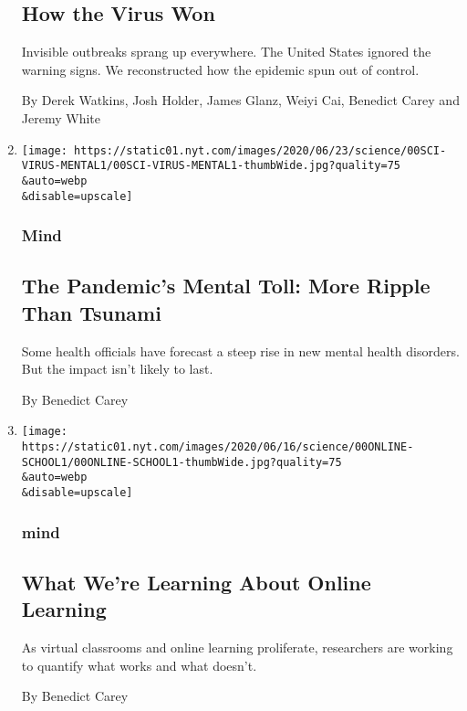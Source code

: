 \begin{enumerate}
  \hypertarget{how-the-virus-won}{%
  \subsection{How the Virus Won}\label{how-the-virus-won}}

  Invisible outbreaks sprang up everywhere. The United States ignored
  the warning signs. We reconstructed how the epidemic spun out of
  control.

  By Derek Watkins, Josh Holder, James Glanz, Weiyi Cai, Benedict Carey
  and Jeremy White
\item
  \href{/2020/06/21/health/coronavirus-mental-health-anxiety.html}{}

  \texttt{[image: https://static01.nyt.com/images/2020/06/23/science/00SCI-VIRUS-MENTAL1/00SCI-VIRUS-MENTAL1-thumbWide.jpg?quality=75\\\&auto=webp\\\&disable=upscale]}

  \hypertarget{mind}{%
  \subsubsection{Mind}\label{mind}}

  \hypertarget{the-pandemics-mental-toll-more-ripple-than-tsunami}{%
  \subsection{The Pandemic's Mental Toll: More Ripple Than
  Tsunami}\label{the-pandemics-mental-toll-more-ripple-than-tsunami}}

  Some health officials have forecast a steep rise in new mental health
  disorders. But the impact isn't likely to last.

  By Benedict Carey
\item
  \href{/2020/06/13/health/school-learning-online-education.html}{}

  \texttt{[image: https://static01.nyt.com/images/2020/06/16/science/00ONLINE-SCHOOL1/00ONLINE-SCHOOL1-thumbWide.jpg?quality=75\\\&auto=webp\\\&disable=upscale]}

  \hypertarget{mind-1}{%
  \subsubsection{mind}\label{mind-1}}

  \hypertarget{what-were-learning-about-online-learning}{%
  \subsection{What We're Learning About Online
  Learning}\label{what-were-learning-about-online-learning}}

  As virtual classrooms and online learning proliferate, researchers are
  working to quantify what works and what doesn't.

  By Benedict Carey
\end{enumerate}

